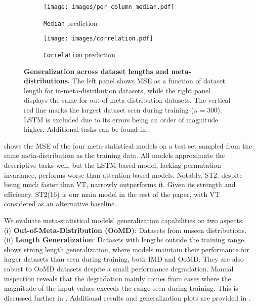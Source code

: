 \begin{figure}[t] 
    \centering
    \begin{subfigure}[t]{0.49\textwidth}
        \centering
        \texttt{[image: images/per\_column\_median.pdf]} 
        \caption{\texttt{Median} prediction}
        \label{fig:subfig_b}
    \end{subfigure}
    \vspace{0.5cm} 
    \begin{subfigure}[t]{0.49\textwidth}
        \centering
        \texttt{[image: images/correlation.pdf]}
        \caption{\texttt{Correlation} prediction}
        \label{fig:subfig_c}
    \end{subfigure}
    \hfill
    \vspace{-0.5cm}
    \caption{\textbf{Generalization across dataset lengths and meta-distributions.} The left panel shows MSE as a function of dataset length for in-meta-distribution datasets, while the right panel displays the same for out-of-meta-distribution datasets. The vertical red line marks the largest dataset seen during training ($n = 300$). LSTM is excluded due to its errors being an order of magnitude higher. Additional tasks can be found in .}
    \label{fig:generalization}
\end{figure}

 shows the MSE of the four meta-statistical models on a test set sampled from the same meta-distribution as the training data. All models approximate the descriptive tasks well, but the LSTM-based model, lacking permutation invariance, performs worse than attention-based models. 
Notably, ST2, despite being much faster than VT, narrowly outperforms it. Given its strength and efficiency, ST2(16) is our main model in the rest of the paper, with VT considered as an alternative baseline.

We evaluate meta-statistical models' generalization capabilities on two aspects:  (i) \textbf{Out-of-Meta-Distribution (OoMD)}: Datasets from unseen distributions. (ii) \textbf{Length Generalization}: Datasets with lengths outside the training range.  shows strong length generalization, where models maintain their performance for larger datasets than seen during training, both IMD and OoMD. 
They are also robust to OoMD datasets despite a small performance degradation. Manual inspection reveals that the degradation mainly comes from cases where the magnitude of the input values exceeds the range seen during training. This is discussed further in .
Additional results and generalization plots are provided in .


